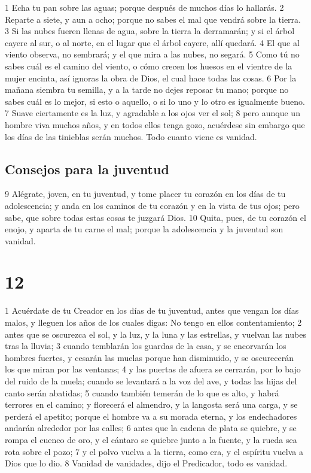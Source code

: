 1 Echa tu pan sobre las aguas; porque después de muchos días lo hallarás.
2 Reparte a siete, y aun a ocho; porque no sabes el mal que vendrá sobre la tierra.
3 Si las nubes fueren llenas de agua, sobre la tierra la derramarán; y si el árbol cayere al sur, o al norte, en el lugar que el árbol cayere, allí quedará.
4 El que al viento observa, no sembrará; y el que mira a las nubes, no segará.
5 Como tú no sabes cuál es el camino del viento, o cómo crecen los huesos en el vientre de la mujer encinta, así ignoras la obra de Dios, el cual hace todas las cosas.
6 Por la mañana siembra tu semilla, y a la tarde no dejes reposar tu mano; porque no sabes cuál es lo mejor, si esto o aquello, o si lo uno y lo otro es igualmente bueno.
7 Suave ciertamente es la luz, y agradable a los ojos ver el sol;
8 pero aunque un hombre viva muchos años, y en todos ellos tenga gozo, acuérdese sin embargo que los días de las tinieblas serán muchos. Todo cuanto viene es vanidad.

\section*{Consejos para la juventud}

9 Alégrate, joven, en tu juventud, y tome placer tu corazón en los días de tu adolescencia; y anda en los caminos de tu corazón y en la vista de tus ojos; pero sabe, que sobre todas estas cosas te juzgará Dios.
10 Quita, pues, de tu corazón el enojo, y aparta de tu carne el mal; porque la adolescencia y la juventud son vanidad.

\chapter{12}

1 Acuérdate de tu Creador en los días de tu juventud, antes que vengan los días malos, y lleguen los años de los cuales digas: No tengo en ellos contentamiento;
2 antes que se oscurezca el sol, y la luz, y la luna y las estrellas, y vuelvan las nubes tras la lluvia;
3 cuando temblarán los guardas de la casa, y se encorvarán los hombres fuertes, y cesarán las muelas porque han disminuido, y se oscurecerán los que miran por las ventanas;
4 y las puertas de afuera se cerrarán, por lo bajo del ruido de la muela; cuando se levantará a la voz del ave, y todas las hijas del canto serán abatidas;
5 cuando también temerán de lo que es alto, y habrá terrores en el camino; y florecerá el almendro, y la langosta será una carga, y se perderá el apetito; porque el hombre va a su morada eterna, y los endechadores andarán alrededor por las calles;
6 antes que la cadena de plata se quiebre, y se rompa el cuenco de oro, y el cántaro se quiebre junto a la fuente, y la rueda sea rota sobre el pozo;
7 y el polvo vuelva a la tierra, como era, y el espíritu vuelva a Dios que lo dio.
8 Vanidad de vanidades, dijo el Predicador, todo es vanidad.

